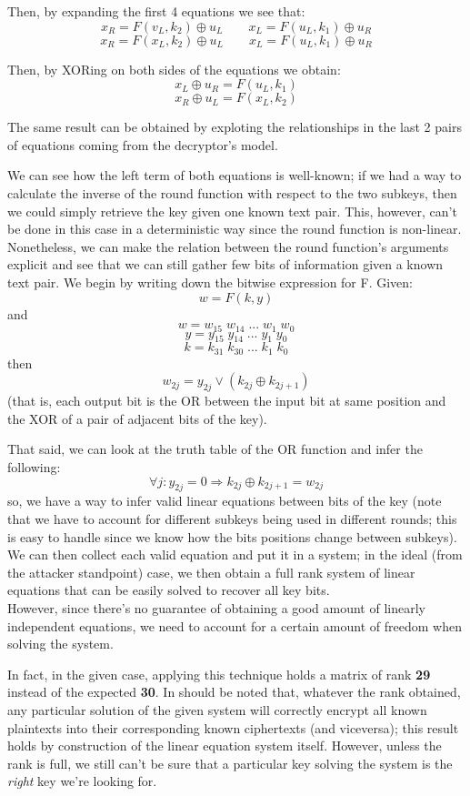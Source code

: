 \documentclass[a4paper,12pt,titlepage]{article}
\begin{document}
Then, by expanding the first 4 equations we see that:
\[ x_R = F(v_L, k_2) \oplus u_L \qquad x_L = F(u_L, k_1) \oplus u_R \]
\[ x_R = F(x_L, k_2) \oplus u_L \qquad x_L = F(u_L, k_1) \oplus u_R \]

Then, by XORing on both sides of the equations we obtain:
\[x_L \oplus u_R = F(u_L, k_1)\]
\[x_R \oplus u_L = F(x_L, k_2)\]

The same result can be obtained by exploting the relationships in the last 2
pairs of equations coming from the decryptor's model.

We can see how the left term of both equations is well-known; if we had a way
to calculate the inverse of the round function with respect to the two subkeys,
then we could simply retrieve the key given one known text pair. This, however,
can't be done in this case in a deterministic way since the round function is
non-linear. Nonetheless, we can make the relation between the round function's
arguments explicit and see that we can still gather few bits of information
given a known text pair. We begin by writing down the bitwise expression for F.
Given:
\[w = F(k, y)\]
and
\[w = w_{15} \; w_{14} \; ... \; w_1 \; w_0\]
\[y = y_{15} \; y_{14} \; ... \; y_1 \; y_0\]
\[k = k_{31} \; k_{30} \; ... \; k_1 \; k_0\]
then
\[w_{2j} = y_{2j} \vee (k_{2j} \oplus k_{2j+1})\]
(that is, each output bit is the OR between the input bit at same position and
the XOR of a pair of adjacent bits of the key).

That said, we can look at the truth table of the OR function and infer the
following:
\[\forall j : y_{2j} = 0 \Rightarrow k_{2j} \oplus k_{2j+1} = w_{2j}\]
so, we have a way to infer valid linear equations between bits of the key (note
that we have to account for different subkeys being used in different rounds;
this is easy to handle since we know how the bits positions change between
subkeys). \\
We can then collect each valid equation and put it in a system; in the ideal (from
the attacker standpoint) case, we then obtain a full rank system of linear
equations that can be easily solved to recover all key bits. \\
However, since there's no guarantee of obtaining a good amount of linearly
independent equations, we need to account for a certain amount of freedom when
solving the system.

In fact, in the given case, applying this technique holds a matrix of rank
\textbf{29} instead of the expected \textbf{30}. In should be noted that,
whatever the rank obtained, any particular solution of the given system will
correctly encrypt all known plaintexts into their corresponding known
ciphertexts (and viceversa); this result holds by construction of the linear
equation system itself. However, unless the rank is full, we still can't be sure
that a particular key solving the system is the \emph{right} key we're looking
for. \\
\end{document}

